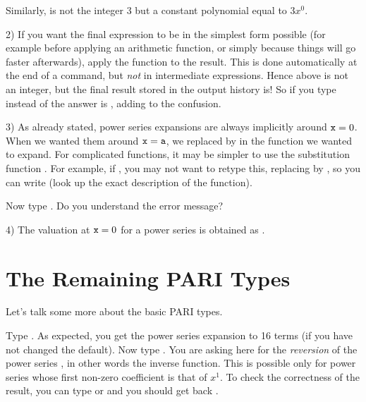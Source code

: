 Similarly,  is not the integer 3 but a constant polynomial
equal to $3x^0$.

2) If you want the final expression to be in the simplest form possible (for
example before applying an arithmetic function, or simply because things will
go faster afterwards), apply the function  to the result.
This is done automatically at the end of a  command, but
\emph{not} in intermediate expressions. Hence  above is not an
integer, but the final result stored in the output history is! So
if you type  instead of  the answer is
, adding to the confusion.

3) As already stated, power series expansions are always implicitly around
${\tt x} = 0$. When we wanted them around ${\tt x} = {\tt a}$, we replaced
 by  in the function we wanted to expand. For complicated
functions, it may be simpler to use the substitution function .
For example, if ,
you may not want to retype this, replacing  by , so you can
write  (look up the exact description of the
 function).

Now type . Do you understand the error message?

4) The valuation at ${\tt x} = 0$ for a power series  is obtained
as .

\section{The Remaining PARI Types}
Let's talk some more about the basic PARI types.

Type . As expected, you get the power series expansion
to 16 terms (if you have not changed the default). Now type
. You are asking here for the \emph{reversion} of the
power series , in other words the inverse function. This is possible
only for power series whose first non-zero coefficient is that of $x^1$.  To
check the correctness of the result, you can type  or
 and you should get back .

